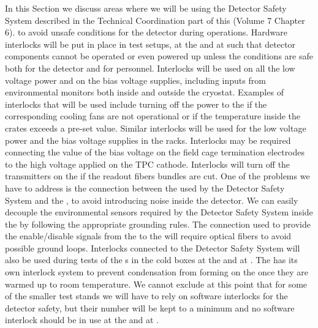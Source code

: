 In this Section we discuss areas where we will be using
the Detector Safety System described in the Technical
Coordination part of this  (Volume 7 Chapter 6). %
to avoid unsafe conditions for the  detector 
during operations. Hardware interlocks will be put in place
in test setups, at the  and at \surf such that
detector components cannot be operated or even powered up
unless the conditions are safe
both for the detector and for personnel. Interlocks will be
used on all the low voltage power and on the bias voltage 
supplies, including inputs from environmental monitors both
inside and outside the cryostat. Examples of interlocks that
will be used include turning off the power to the 
if the corresponding cooling fans are not operational or
if the temperature inside the crates exceeds a pre-set value.
Similar interlocks will be used for the low voltage power
and the bias voltage supplies in the  racks.
Interlocks may be required connecting the value of the 
bias voltage on the field cage termination electrodes to the
high voltage applied on the TPC cathode. Interlocks will turn 
off the transmitters on the  if the readout fibers 
bundles are cut. One of the problems we have to address is 
the connection between the  used by the Detector 
Safety System and the , to avoid introducing noise 
inside the detector. We can easily decouple the environmental 
sensors required by the Detector Safety System inside the 
 by following the appropriate grounding rules. 
The connection used to provide the enable/disable signals 
from the  to the  will require optical 
fibers to avoid possible ground loops. Interlocks connected
to the Detector Safety System will also be used during tests 
of the s in the cold boxes at the  and 
at \surf. The  has its own interlock system to
prevent condensation from forming on the  once
they are warmed up to room temperature. We cannot exclude at
this point that for some of the smaller test stands we will 
have to rely on software interlocks for the detector safety,
but their number will be kept to a minimum and no software
interlock should be in use at the  and at \surf.
